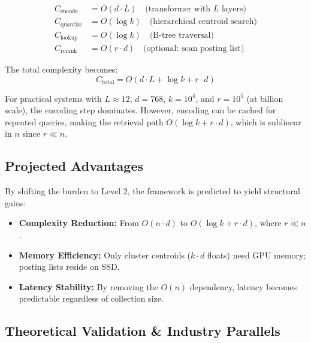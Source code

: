\documentclass[manuscript,screen,nonacm]{acmart}
\begin{document}
\begin{align}
C_{\text{encode}} &= O(d \cdot L) \quad \text{(transformer with } L \text{ layers)} \\
C_{\text{quantize}} &= O(\log k) \quad \text{(hierarchical centroid search)} \\
C_{\text{lookup}} &= O(\log k) \quad \text{(B-tree traversal)} \\
C_{\text{rerank}} &= O(r \cdot d) \quad \text{(optional: scan posting list)}
\end{align}

The total complexity becomes:
\begin{equation}
C_{\text{total}} = O(d \cdot L + \log k + r \cdot d)
\label{eq:totalfinal}
\end{equation}

For practical systems with $L \approx 12$, $d = 768$, $k = 10^4$, and $r = 10^5$ (at billion scale), the encoding step dominates. However, encoding can be cached for repeated queries, making the retrieval path $O(\log k + r \cdot d)$, which is sublinear in $n$ since $r \ll n$.

\subsection{Projected Advantages}

By shifting the burden to Level 2, the framework is predicted to yield structural gains:
\begin{itemize}
    \item \textbf{Complexity Reduction:} From $O(n \cdot d)$ to $O(\log k + r \cdot d)$, where $r \ll n$.
    \item \textbf{Memory Efficiency:} Only cluster centroids ($k \cdot d$ floats) need GPU memory; posting lists reside on SSD.
    \item \textbf{Latency Stability:} By removing the $O(n)$ dependency, latency becomes predictable regardless of collection size.
\end{itemize}

\subsection{Theoretical Validation \& Industry Parallels}
\end{document}
